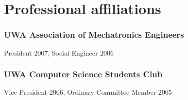 \documentclass[10pt, a4paper]{report}
\begin{document}
\section*{Professional affiliations}
\subsubsection{UWA Association of Mechatronics Engineers}
President 2007, Social Engineer 2006
\subsubsection{UWA Computer Science Students Club}
Vice-President 2006, Ordinary Committee Member 2005
\end{document}
